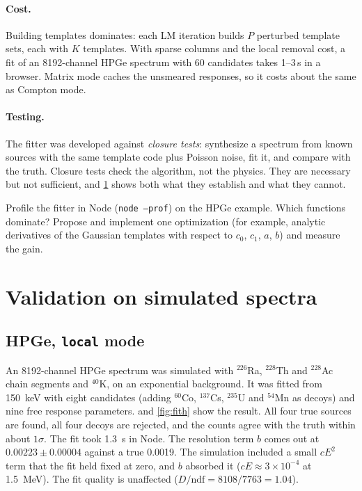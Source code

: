\documentclass[11pt]{article}
\newcounter{exercise}[section]
\newcommand{\code}[1]{\texttt{#1}}
\newcommand{\nuc}[2]{${}^{#1}$#2}
\begin{document}
\paragraph{Cost.} Building templates dominates: each LM iteration builds $P$ perturbed template sets, each with $K$ templates. With sparse columns and the local removal cost, a fit of an 8192-channel HPGe spectrum with 60 candidates takes 1--3\,s in a browser. Matrix mode caches the unsmeared responses, so it costs about the same as Compton mode.

\paragraph{Testing.} The fitter was developed against \emph{closure tests}: synthesize a spectrum from known sources with the same template code plus Poisson noise, fit it, and compare with the truth. Closure tests check the algorithm, not the physics. They are necessary but not sufficient, and \cref{sec:validation} shows both what they establish and what they cannot.

\begin{exercise}[P]
Profile the fitter in Node (\code{node --prof}) on the HPGe example. Which functions dominate? Propose and implement one optimization (for example, analytic derivatives of the Gaussian templates with respect to $c_0$, $c_1$, $a$, $b$) and measure the gain.
\end{exercise}

\section{Validation on simulated spectra}\label{sec:validation}
\subsection{HPGe, \code{local} mode}
An 8192-channel HPGe spectrum was simulated with \nuc{226}{Ra}, \nuc{228}{Th} and \nuc{228}{Ac} chain segments and \nuc{40}{K}, on an exponential background. It was fitted from \SI{150}{keV} with eight candidates (adding \nuc{60}{Co}, \nuc{137}{Cs}, \nuc{235}{U} and \nuc{54}{Mn} as decoys) and nine free response parameters.  and \cref{fig:fith} show the result. All four true sources are found, all four decoys are rejected, and the counts agree with the truth within about $1\sigma$. The fit took \SI{1.3}{s} in Node. The resolution term $b$ comes out at $0.00223\pm0.00004$ against a true 0.0019. The simulation included a small $cE^2$ term that the fit held fixed at zero, and $b$ absorbed it ($cE\approx3\times10^{-4}$ at \SI{1.5}{MeV}). The fit quality is unaffected ($D/\mathrm{ndf} = 8108/7763 = 1.04$).
\end{document}
